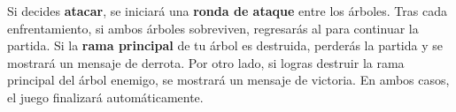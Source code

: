 Si decides \textbf{atacar}, se iniciará una \textbf{ronda de ataque} entre los árboles. Tras cada enfrentamiento, si ambos árboles sobreviven, regresarás al  para continuar la partida. Si la \textbf{rama principal} de tu árbol es destruida, perderás la partida y se mostrará un mensaje de derrota. Por otro lado, si logras destruir la rama principal del árbol enemigo, se mostrará un mensaje de victoria. En ambos casos, el juego finalizará automáticamente.